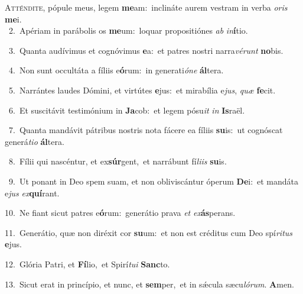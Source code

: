 \lettrine{\initial\textcolor{\initialcolor}{A}}{tténdite,} pópule meus, legem \textbf{me}\-am:~\star inclináte aurem vestram in verba \textit{o}\-\textit{ris} \textbf{me}\-i.\\
{\numbfont\textcolor{\numbcolor}{~2.}}~Apériam in parábolis os \textbf{me}\-um:~\star loquar propositiónes \textit{ab} \textit{in}\-\textbf{í}tio.\par
{\numbfont\textcolor{\numbcolor}{~3.}}~Quanta audívimus et cognóvimus \textbf{e}\-a:~\star et patres nostri narra\-\textit{vé}\-\textit{runt} \textbf{no}\-bis.\par
{\numbfont\textcolor{\numbcolor}{~4.}}~Non sunt occultáta a fíliis e\-\textbf{ó}\-rum:~\star in generati\-\textit{ó}\-\textit{ne} \textbf{ál}\-tera.\par
{\numbfont\textcolor{\numbcolor}{~5.}}~Narrántes laudes Dómini, et virtútes \textbf{e}\-jus:~\star et mirabília e\-\textit{jus}\-, \textit{quæ} \textbf{fe}\-cit.\par
{\numbfont\textcolor{\numbcolor}{~6.}}~Et suscitávit testimónium in \textbf{Ja}\-cob:~\star et legem pósu\textit{it} \textit{in} \textbf{Is}\-raël.\par
{\numbfont\textcolor{\numbcolor}{~7.}}~Quanta mandávit pátribus nostris nota fácere ea fíliis \textbf{su}\-is:~\star ut cognóscat generá\-\textit{ti}\-\textit{o} \textbf{ál}\-tera.\par
{\numbfont\textcolor{\numbcolor}{~8.}}~Fílii qui nascéntur, et ex\-\textbf{súr}\-gent,~\star et narrábunt fí\-\textit{li}\-\textit{is} \textbf{su}\-is.\par
{\numbfont\textcolor{\numbcolor}{~9.}}~Ut ponant in Deo spem suam, et non obliviscántur óperum \textbf{De}\-i:~\star et mandáta e\textit{jus} \textit{ex}\-\textbf{quí}rant.\par
{\numbfont\textcolor{\numbcolor}{10.}}~Ne fiant sicut patres e\-\textbf{ó}\-rum:~\star generátio prava \textit{et} \textit{ex}\-\textbf{ás}perans.\par
{\numbfont\textcolor{\numbcolor}{11.}}~Generátio, quæ non diréxit cor \textbf{su}\-um:~\star et non est créditus cum Deo spí\-\textit{ri}\-\textit{tus} \textbf{e}\-jus.\par
{\numbfont\textcolor{\numbcolor}{12.}}~Glória Patri, et \textbf{Fí}\-lio,~\star et Spirí\-\textit{tu}\-\textit{i} \textbf{Sanc}\-to.\par
{\numbfont\textcolor{\numbcolor}{13.}}~Sicut erat in princípio, et nunc, et \textbf{sem}\-per,~\star et in sǽcula sæcu\-\textit{ló}\-\textit{rum}. \textbf{A}\-men.\par
